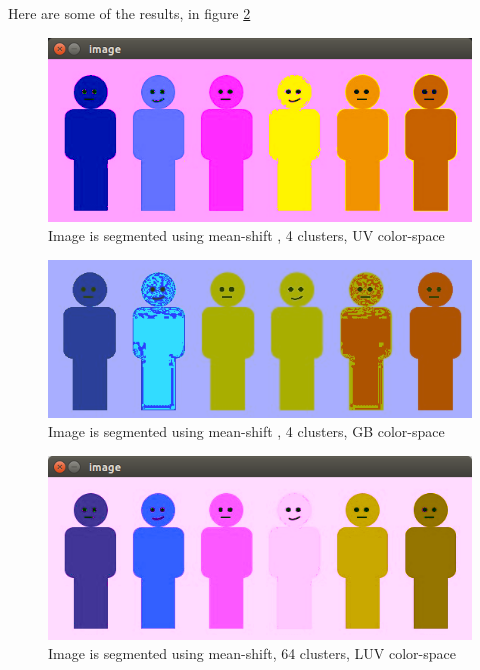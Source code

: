 \documentclass[letterpaper, 12 pt, conference ,onecolumn]{ieeeconf}  %
\begin{document}
Here are some of the results, in figure \ref{fig:mean-shift-4}
\begin{figure}[h!]
\includegraphics[width=0.4\paperwidth]{mean-shift/window128-4cluster}
\centering
\caption{Image is segmented using mean-shift , 4 clusters, UV color-space }
\label{fig:mean-shift-4}
\end{figure}

\begin{figure}[h!]
\includegraphics[width=0.4\paperwidth]{mean-shift/mean-shift-rgb-4}
\centering
\caption{Image is segmented using mean-shift , 4 clusters, GB color-space }
\label{fig:mean-shift-4}
\end{figure}

\begin{figure}[H]
\includegraphics[width=0.4\paperwidth]{mean-shift/window32-64cluster}
\centering
\caption{Image is segmented using mean-shift, 64 clusters, LUV color-space }
\label{fig:mean-shift-64}
\end{figure}
\end{document}
